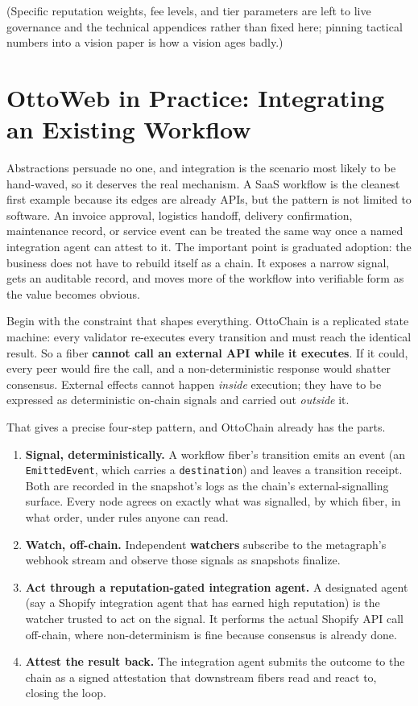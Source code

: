 \documentclass[11pt,a4paper]{article}
\begin{document}
(Specific reputation weights, fee levels, and tier parameters are left to live governance and the technical appendices rather than fixed here; pinning tactical numbers into a vision paper is how a vision ages badly.)

\section{OttoWeb in Practice: Integrating an Existing Workflow}

Abstractions persuade no one, and integration is the scenario most likely to be hand-waved, so it deserves the real mechanism. A SaaS workflow is the cleanest first example because its edges are already APIs, but the pattern is not limited to software. An invoice approval, logistics handoff, delivery confirmation, maintenance record, or service event can be treated the same way once a named integration agent can attest to it. The important point is graduated adoption: the business does not have to rebuild itself as a chain. It exposes a narrow signal, gets an auditable record, and moves more of the workflow into verifiable form as the value becomes obvious.

Begin with the constraint that shapes everything. OttoChain is a replicated state machine: every validator re-executes every transition and must reach the identical result. So a fiber \textbf{cannot call an external API while it executes}. If it could, every peer would fire the call, and a non-deterministic response would shatter consensus. External effects cannot happen \emph{inside} execution; they have to be expressed as deterministic on-chain signals and carried out \emph{outside} it.

That gives a precise four-step pattern, and OttoChain already has the parts.

\begin{enumerate}
    \item \textbf{Signal, deterministically.} A workflow fiber's transition emits an event (an \texttt{EmittedEvent}, which carries a \texttt{destination}) and leaves a transition receipt. Both are recorded in the snapshot's logs as the chain's external-signalling surface. Every node agrees on exactly what was signalled, by which fiber, in what order, under rules anyone can read.
    \item \textbf{Watch, off-chain.} Independent \textbf{watchers} subscribe to the metagraph's webhook stream and observe those signals as snapshots finalize.
    \item \textbf{Act through a reputation-gated integration agent.} A designated agent (say a Shopify integration agent that has earned high reputation) is the watcher trusted to act on the signal. It performs the actual Shopify API call off-chain, where non-determinism is fine because consensus is already done.
    \item \textbf{Attest the result back.} The integration agent submits the outcome to the chain as a signed attestation that downstream fibers read and react to, closing the loop.
\end{enumerate}
\end{document}
